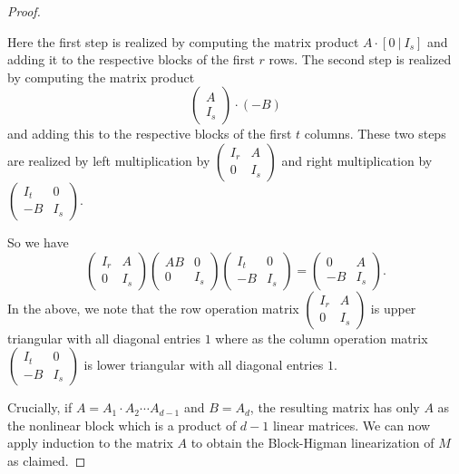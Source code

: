 \documentclass[10pt,a4paper]{article}
\begin{document}
\begin{proof}
\begin{itemize}
Here the first step is realized by computing the matrix product
$A\cdot [0~|~I_s]$ and adding it to the respective blocks of the first
$r$ rows. The second step is realized by computing the matrix product
\[
 \left(
\begin{array}{c}
  A \\
  I_s
\end{array}
\right)\cdot (-B)
\]
and adding this to the respective blocks of the first $t$ columns.
These two steps are realized by left multiplication by $\left(
\begin{array}{c|c}
I_r & A \\
\hline
0 & I_s
\end{array}
\right)$ and right multiplication by $\left(
\begin{array}{c|c}
I_t & 0 \\
\hline
 -B & I_s
\end{array}
\right).$
\end{itemize}
So we have
\[\left(
\begin{array}{cc}
I_r & A \\
%
0 & I_s
\end{array}
\right)
\left(
\begin{array}{cc}
AB & 0 \\
0 & I_s
\end{array}
\right)
\left(
\begin{array}{cc}
I_t & 0 \\
%
 -B & I_s
\end{array}
\right) = 
\left(
\begin{array}{cc}
0 & A \\
-B & I_s
\end{array}
\right).
\]
In the above, we note that the row operation matrix $\left(
\begin{array}{cc}
I_r & A \\
%
0 & I_s
\end{array}
\right)$ is upper triangular with all diagonal entries $1$ where as the column operation matrix $\left(
\begin{array}{cc}
I_t & 0 \\
%
 -B & I_s
\end{array}
\right)$ is lower triangular with all diagonal entries $1$. 

Crucially, if $A=A_1\cdot A_2\cdots A_{d-1}$ and $B=A_d$, the
resulting matrix has only $A$ as the nonlinear block which is a
product of $d-1$ linear matrices. We can now apply induction to
the matrix $A$ to obtain the Block-Higman linearization of $M$
as claimed. 


\end{proof}
\end{document}
